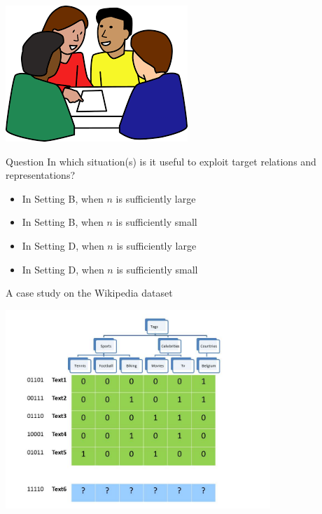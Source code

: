 \documentclass[]{beamer}
\begin{document}
\begin{frame}

\begin{center}
\includegraphics[scale=0.5]{Figures/interaction}
\end{center}
\begin{exampleblock}{Question}
In which situation(s) is it useful to exploit target relations and representations?   
\begin{itemize}
\item In Setting B, when $n$ is sufficiently large
\item In Setting B, when $n$ is sufficiently small
\item In Setting D, when $n$ is sufficiently large
\item In Setting D, when $n$ is sufficiently small
\end{itemize}
\end{exampleblock}
\end{frame}


\begin{frame}{A case study on the Wikipedia dataset}
\begin{center}
\includegraphics[width=0.75\textwidth,trim = 0 0 100 0,clip]{Figures/pictures/Slide5}
\end{center}
\end{frame}
\end{document}
